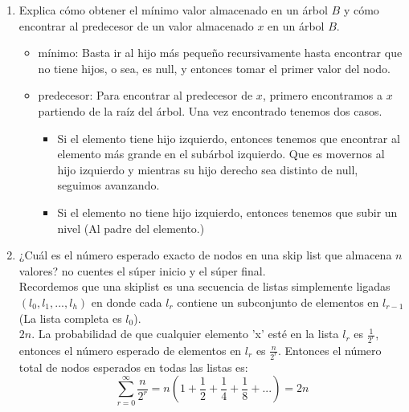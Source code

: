 \documentclass[spanish,12pt,letterpaper]{article}
\begin{document}
\begin{enumerate}
  
  
\item Explica cómo obtener el mínimo valor almacenado en un árbol $B$ y cómo
  encontrar al predecesor de un valor almacenado $x$ en un árbol $B$.\\
  \begin{itemize}
  \item mínimo: Basta ir al hijo más pequeño recursivamente hasta encontrar que
    no tiene hijos, o sea, es null, y entonces tomar el primer valor del nodo.
  \item predecesor: Para encontrar al predecesor de $x$, primero encontramos a
    $x$ partiendo de la raíz del árbol. Una vez encontrado tenemos dos casos.
    \begin{itemize}
    \item Si el elemento tiene hijo izquierdo, entonces tenemos que encontrar
      al elemento más grande en el subárbol izquierdo. Que es movernos al hijo
      izquierdo y mientras su hijo derecho sea distinto de null, seguimos
      avanzando.
    \item Si el elemento no tiene hijo izquierdo, entonces tenemos que subir un
      nivel (Al padre del elemento.)
    \end{itemize}
  \end{itemize}
  
\item ¿Cuál es el número esperado exacto de nodos en una skip list que almacena
  $n$ valores? no cuentes el súper inicio y el súper final.\\
  Recordemos que una skiplist es una secuencia de listas simplemente ligadas
  $(l_0, l_1, ..., l_h)$ en donde cada $l_r$ contiene un subconjunto de elementos
  en $l_{r-1}$ (La lista completa es $l_0$).\\
  $2n$. La probabilidad de que cualquier elemento 'x' esté en la lista $l_r$ es
  $\frac{1}{2^r}$, entonces el número esperado de elementos en $l_r$ es
  $\frac{n}{2^r}$. Entonces el número total de nodos esperados en todas las
  listas es:
  \[\sum_{r=0}^{\infty} \frac{n}{2^r} = n(1 + \frac{1}{2} + \frac{1}{4} +
  \frac{1}{8} + ...) = 2n\]
  

\end{enumerate}
\end{document}
